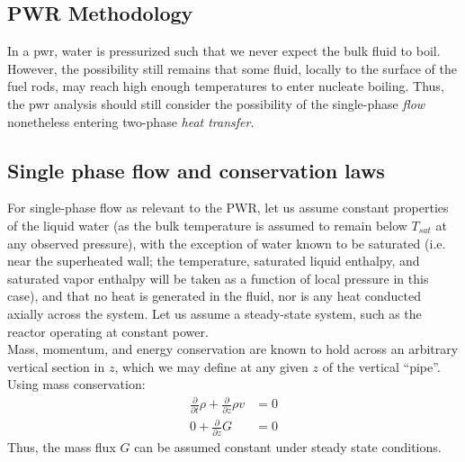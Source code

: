 \documentclass[12pt]{article}
\begin{document}
\subsection{PWR Methodology}
In a \gls{pwr}, water is pressurized such that we never expect the bulk fluid to boil.
However, the possibility still remains that some fluid, locally to the surface of the fuel rods, may reach high enough temperatures to enter nucleate boiling.
Thus, the \gls{pwr} analysis should still consider the possibility of the single-phase \emph{flow} nonetheless entering two-phase \emph{heat transfer}.
\subsection{Single phase flow and conservation laws}
For single-phase flow as relevant to the PWR, let us assume constant properties of the liquid water (as the bulk temperature is assumed to remain below $T_{sat}$ at any observed pressure), with the exception of water known to be saturated (i.e. near the superheated wall; the temperature, saturated liquid enthalpy, and saturated vapor enthalpy will be taken as a function of local pressure in this case), and that no heat is generated in the fluid, nor is any heat conducted axially across the system.
Let us assume a steady-state system, such as the reactor operating at constant power.\\

Mass, momentum, and energy conservation are known to hold across an arbitrary vertical section in $z$, which we may define at any given $z$ of the vertical ``pipe''.
Using mass conservation:
\newcommand{\dd}[1]{\frac{\partial}{\partial#1}}
\newcommand{\ddt}{\dd{t}}
\newcommand{\ddz}{\dd{z}}
\begin{align}
    \dd{t}\rho + \dd{z}\rho v &= 0 \\
    0 + \dd{z}G &= 0
\end{align}
Thus, the mass flux $G$ can be assumed constant under steady state conditions.\\
\end{document}
